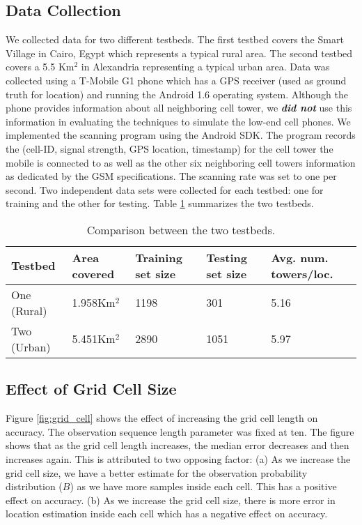 \documentclass[conference]{IEEEtran}
\begin{document}
\subsection{Data Collection}
We collected data for two different testbeds. The first testbed
covers the Smart Village in Cairo, Egypt which represents a typical
rural area. The second testbed covers a 5.5 Km$^2$ in Alexandria
representing a typical urban area. Data was collected using a
T-Mobile G1 phone which has a GPS receiver (used as ground truth for
location) and running the Android 1.6 operating system. Although the
phone provides information about all neighboring cell tower, we
\emph{\textbf{did not }}use this information in evaluating
the techniques to simulate the low-end cell phones.
We implemented the scanning program using the Android SDK. The
program records the (cell-ID, signal strength, GPS location,
timestamp) for the cell tower the mobile is connected to as well as
the other six neighboring cell towers information as dedicated by
the GSM specifications. The scanning rate was set to one per second.
Two independent data sets were collected for each testbed: one for
training and the other for testing. Table \ref{testbeds} summarizes
the two testbeds.

\begin{table}
\centering
\begin{tabular}{|p{0.42in}||p{0.45in}|p{0.55in}|p{0.55in}|p{0.6in}|}
\hline

Testbed & Area covered & Training set size & Testing set size& Avg. num. towers/loc.\\
\hline
 One (Rural)& 1.958Km$^2$ & 1198 & 301 &  5.16\\
\hline
Two (Urban)& 5.451Km$^2$ & 2890 & 1051 & 5.97\\
\hline


\end{tabular}
\caption{Comparison between the two testbeds.} \label{testbeds}
\end{table}

\subsection{Effect of Grid Cell Size}
Figure \ref{fig:grid_cell} shows the effect of increasing the grid
cell length on accuracy. The observation sequence length parameter
was fixed at ten. The figure shows that as the grid cell length
increases, the median error decreases and then increases again. This
is attributed to two opposing factor: (a) As we increase the grid
cell size, we have a better estimate for the observation probability
distribution ($B$) as we have more samples inside each cell. This
has a positive effect on accuracy. (b) As we increase the grid cell
size, there is more error in location estimation inside each cell
which has a negative effect on accuracy.
\end{document}
